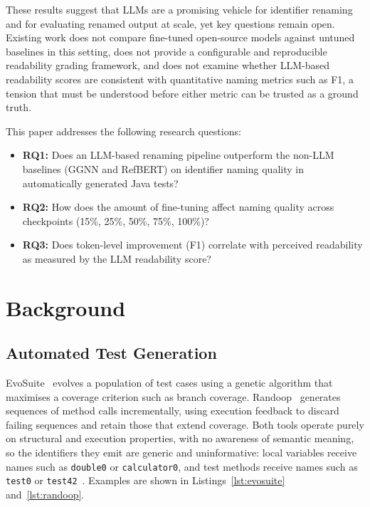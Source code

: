 \documentclass[conference]{IEEEtran}
\begin{document}
These results suggest that LLMs are a promising vehicle for identifier renaming
and for evaluating renamed output at scale, yet key questions remain open.
Existing work does not compare fine-tuned open-source models against untuned
baselines in this setting, does not provide a configurable and reproducible
readability grading framework, and does not examine whether LLM-based
readability scores are consistent with quantitative naming metrics such as F1,
a tension that must be understood before either metric can be trusted as a
ground truth.

This paper addresses the following research questions:

\begin{itemize}
  \item \textbf{RQ1:} Does an LLM-based renaming pipeline outperform the
    non-LLM baselines (GGNN and RefBERT) on identifier naming quality in
    automatically generated Java tests?
  \item \textbf{RQ2:} How does the amount of fine-tuning affect naming quality
    across checkpoints (15\%, 25\%, 50\%, 75\%, 100\%)?
  \item \textbf{RQ3:} Does token-level improvement (F1) correlate with
    perceived readability as measured by the LLM readability score?
\end{itemize}

\section{Background}

\subsection{Automated Test Generation}

EvoSuite~\cite{fraser2011evosuite} evolves a population of test cases using a
genetic algorithm that maximises a coverage criterion such as branch coverage.
Randoop~\cite{randoop2024tool,pacheco2007feedback} generates sequences of
method calls incrementally, using execution feedback to discard failing
sequences and retain those that extend coverage.
Both tools operate purely on structural and execution properties, with no
awareness of semantic meaning, so the identifiers they emit are generic and
uninformative: local variables receive names such as \texttt{double0} or
\texttt{calculator0}, and test methods receive names such as \texttt{test0} or
\texttt{test42}~\cite{fraser2013evosuite,wang2025automated}.
Examples are shown in Listings~\ref{lst:evosuite} and~\ref{lst:randoop}.
\end{document}
